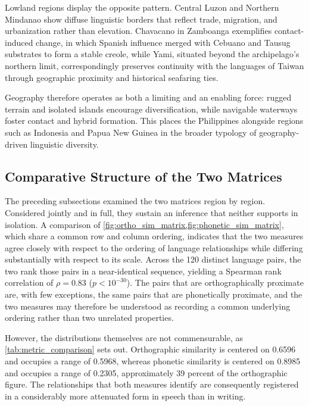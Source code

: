 Lowland regions display the opposite pattern. Central Luzon and Northern
Mindanao show diffuse linguistic borders that reflect trade, migration, and
urbanization rather than elevation. Chavacano in Zamboanga exemplifies
contact-induced change, in which Spanish influence merged with Cebuano and
Tausug substrates to form a stable creole, while Yami, situated beyond the
archipelago's northern limit, correspondingly preserves continuity with the
languages of Taiwan through geographic proximity and historical seafaring ties.

Geography therefore operates as both a limiting and an enabling force: rugged
terrain and isolated islands encourage diversification, while navigable
waterways foster contact and hybrid formation. This places the Philippines
alongside regions such as Indonesia and Papua New Guinea in the broader
typology of geography-driven linguistic diversity.

\subsection{Comparative Structure of the Two Matrices}

The preceding subsections examined the two matrices region by region.
Considered jointly and in full, they sustain an inference that neither supports
in isolation. A comparison of
\cref{fig:ortho_sim_matrix,fig:phonetic_sim_matrix}, which share a common row
and column ordering, indicates that the two measures agree closely with respect
to the ordering of language relationships while differing substantially with
respect to its scale. Across the 120 distinct language pairs, the two rank
those pairs in a near-identical sequence, yielding a Spearman rank correlation
of \( \rho = 0.83 \) (\( p < 10^{-30} \)). The pairs that are orthographically
proximate are, with few exceptions, the same pairs that are phonetically
proximate, and the two measures may therefore be understood as recording a
common underlying ordering rather than two unrelated properties.

However, the distributions themselves are not commensurable, as
\cref{tab:metric_comparison} sets out. Orthographic similarity is centered on
0.6596 and occupies a range of 0.5968, whereas phonetic similarity is centered
on 0.8985 and occupies a range of 0.2305, approximately 39 percent of the
orthographic figure. The relationships that both measures identify are
consequently registered in a considerably more attenuated form in speech than
in writing.

